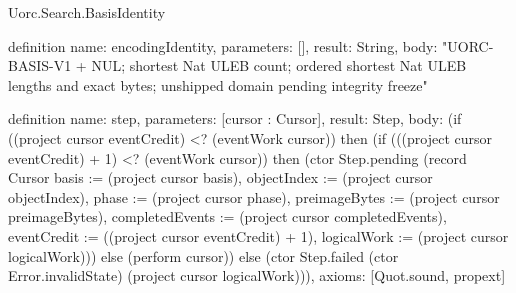 \begin{lexlean}{Uorc.Search.BasisIdentity}
\begin{semanticmodule}
definition{
  name: encodingIdentity,
  parameters: [],
  result: String,
  body: "UORC-BASIS-V1 + NUL; shortest Nat ULEB count; ordered shortest Nat ULEB lengths and exact bytes; unshipped domain pending integrity freeze"
}

definition{
  name: step,
  parameters: [cursor : Cursor],
  result: Step,
  body: (if ((project cursor eventCredit) <? (eventWork cursor)) then (if (((project cursor eventCredit) + 1) <? (eventWork cursor)) then (ctor Step.pending (record Cursor {basis := (project cursor basis), objectIndex := (project cursor objectIndex), phase := (project cursor phase), preimageBytes := (project cursor preimageBytes), completedEvents := (project cursor completedEvents), eventCredit := ((project cursor eventCredit) + 1), logicalWork := (project cursor logicalWork)})) else (perform cursor)) else (ctor Step.failed (ctor Error.invalidState) (project cursor logicalWork))),
  axioms: [Quot.sound, propext]
}
\end{semanticmodule}
\end{lexlean}
